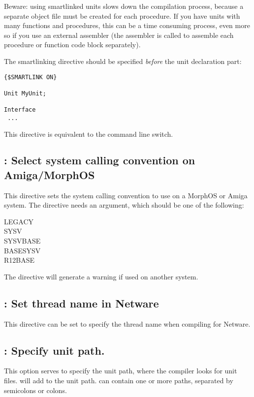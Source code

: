 Beware: using smartlinked units slows down the compilation process, because
a separate object file must be created for each procedure. If you have units
with many functions and procedures, this can be a time consuming process,
even more so if you use an external assembler (the assembler is called to
assemble each procedure or function code block separately).

The smartlinking directive should be specified {\em before} the unit
declaration part:
\begin{verbatim}
{$SMARTLINK ON}

Unit MyUnit;

Interface
 ...
\end{verbatim}

This directive is equivalent to the  command line switch.

\subsection{ : Select system calling convention on Amiga/MorphOS}
This directive sets the system calling convention to use on a MorphOS or
Amiga system. The directive needs an argument, which should be one of the
following:
\begin{description}
\item[LEGACY]
\item[SYSV]
\item[SYSVBASE]
\item[BASESYSV]
\item[R12BASE]
\end{description}
The directive will generate a warning if used on another system.

\subsection{ : Set thread name in Netware}
This directive can be set to specify the thread name when compiling for
Netware. 

\subsection{ : Specify unit path.}

This option serves to specify the unit path, where the compiler looks for
unit files.  will add  to the unit
path.  can contain one or more paths, separated by semicolons or
colons.

